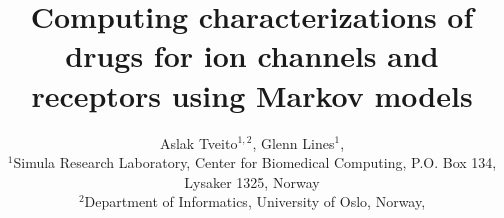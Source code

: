 \documentclass{book}%
\renewcommand{\cite}[1]{\citep{#1}}
\begin{document}
\title{Computing characterizations of drugs for ion channels and receptors using Markov models}
%
\author{Aslak Tveito$^{1,2}$, Glenn Lines$^{1}$,
\\{\small{$^{1}$Simula Research Laboratory, Center for Biomedical Computing,
P.O. Box 134, Lysaker 1325, Norway}}
\\{\small{ $^{2}$Department of Informatics, University of Oslo, Norway,}}}
\maketitle





\bigskip
\tableofcontents












%
%


%


\end{document}

